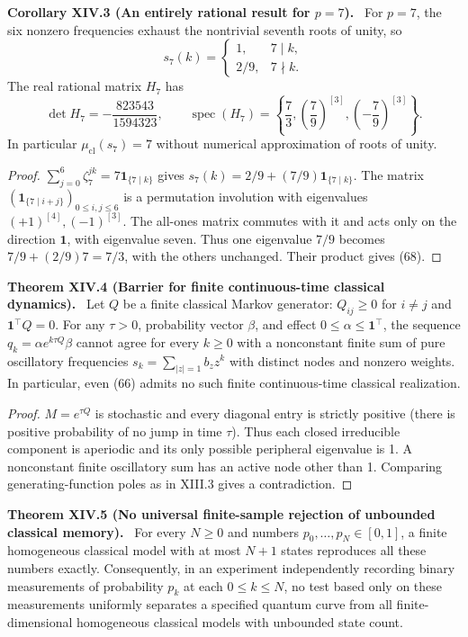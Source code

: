 \documentclass[11pt,a4paper,oneside]{book}
\newcommand{\one}{\mathbf 1}\newcommand{\ii}{\mathrm i}\newcommand{\dd}{\mathrm d}
\DeclareMathOperator{\spec}{spec}\DeclareMathOperator{\diag}{diag}
\newcommand{\statement}[3]{\par\medskip\noindent\textbf{#1 #2 (#3).}\ }
\begin{document}
\statement{Corollary}{XIV.3}{An entirely rational result for $p=7$} For $p=7$, the six nonzero frequencies exhaust the nontrivial seventh roots of unity, so
\[s_7(k)=\begin{cases}1,&7\mid k,\\2/9,&7\nmid k.\end{cases}\]
The real rational matrix $H_7$ has
\begin{equation}\det H_7=-\frac{823543}{1594323},\qquad\spec(H_7)=\left\{\frac73,\left(\frac79\right)^{[3]},\left(-\frac79\right)^{[3]}\right\}.\tag{68}\end{equation}
In particular $\mu_{\mathrm{cl}}(s_7)=7$ without numerical approximation of roots of unity.
\begin{proof}$\sum_{j=0}^6\zeta_7^{jk}=7\one_{\{7\mid k\}}$ gives $s_7(k)=2/9+(7/9)\one_{\{7\mid k\}}$. The matrix $(\one_{\{7\mid i+j\}})_{0\le i,j\le6}$ is a permutation involution with eigenvalues $(+1)^{[4]},(-1)^{[3]}$. The all-ones matrix commutes with it and acts only on the direction $\one$, with eigenvalue seven. Thus one eigenvalue $7/9$ becomes $7/9+(2/9)7=7/3$, with the others unchanged. Their product gives (68).\end{proof}
\statement{Theorem}{XIV.4}{Barrier for finite continuous-time classical dynamics} Let $Q$ be a finite classical Markov generator: $Q_{ij}\ge0$ for $i\ne j$ and $\one^\top Q=0$. For any $\tau>0$, probability vector $\beta$, and effect $0\le\alpha\le\one^\top$, the sequence $q_k=\alpha e^{k\tau Q}\beta$ cannot agree for every $k\ge0$ with a nonconstant finite sum of pure oscillatory frequencies $s_k=\sum_{|z|=1}b_z z^k$ with distinct nodes and nonzero weights. In particular, even (66) admits no such finite continuous-time classical realization.
\begin{proof}$M=e^{\tau Q}$ is stochastic and every diagonal entry is strictly positive (there is positive probability of no jump in time $\tau$). Thus each closed irreducible component is aperiodic and its only possible peripheral eigenvalue is 1. A nonconstant finite oscillatory sum has an active node other than 1. Comparing generating-function poles as in XIII.3 gives a contradiction.\end{proof}
\statement{Theorem}{XIV.5}{No universal finite-sample rejection of unbounded classical memory} For every $N\ge0$ and numbers $p_0,\ldots,p_N\in[0,1]$, a finite homogeneous classical model with at most $N+1$ states reproduces all these numbers exactly. Consequently, in an experiment independently recording binary measurements of probability $p_k$ at each $0\le k\le N$, no test based only on these measurements uniformly separates a specified quantum curve from all finite-dimensional homogeneous classical models with unbounded state count.
\end{document}

